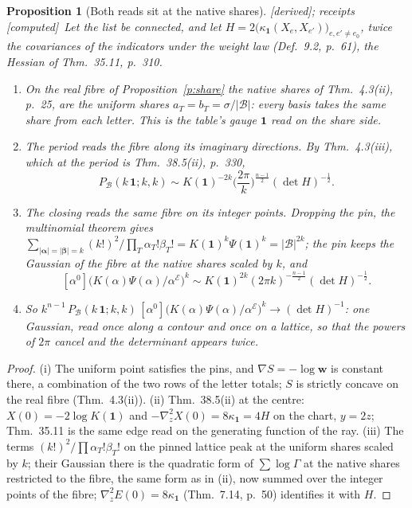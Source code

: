 \documentclass[11pt]{article}
\newcommand{\cE}{\mathcal E}
\newcommand{\cB}{\mathcal B}
\newcommand{\one}{\mathbf 1}
\newcommand{\Pc}[1]{P_{\cB}(#1\,\one;#1,#1)}
\newcommand{\Clo}[1]{[\alpha^0]\big(K(\alpha)\Psi(\alpha)/\alpha^{\cE}\big)^{#1}}
\theoremstyle{plain}
\newtheorem{proposition}{Proposition}[section]
\theoremstyle{definition}
\theoremstyle{remark}
\newcommand{\derived}{\textup{[derived]}}
\newcommand{\computed}{\textup{[computed]}}
\begin{document}
\begin{proposition}[Both reads sit at the native shares]\label{p:edge}\derived; receipts \computed\
Let the list be connected, and let $H=2\big(\kappa_{\one}(X_e,X_{e'})\big)_{e,e'\neq e_0}$, twice the covariances of the indicators under the weight law (Def.~9.2, p.~61), the Hessian of Thm.~35.11, p.~310.
\begin{enumerate}[label=(\roman*)]
\item On the real fibre of Proposition~\ref{p:share} the native shares of Thm.~4.3(ii), p.~25, are the uniform shares $a_T=b_T=\sigma/|\cB|$: every basis takes the same share from each letter. This is the table's gauge $\one$ read on the share side.
\item The period reads the fibre along its imaginary directions. By Thm.~4.3(iii), which at the period is Thm.~38.5(ii), p.~330,
\[
\Pc k\sim K(\one)^{-2k}\Big(\frac{2\pi}k\Big)^{\frac{n-1}2}(\det H)^{-\frac12}.
\]
\item The closing reads the same fibre on its integer points. Dropping the pin, the multinomial theorem gives $\sum_{|\boldsymbol\alpha|=|\boldsymbol\beta|=k}(k!)^2/\prod_T\alpha_T!\beta_T!=K(\one)^k\Psi(\one)^k=|\cB|^{2k}$; the pin keeps the Gaussian of the fibre at the native shares scaled by $k$, and
\[
\Clo k\sim K(\one)^{2k}(2\pi k)^{-\frac{n-1}2}(\det H)^{-\frac12}.
\]
\item So $k^{n-1}\,\Pc k\,\Clo k\to(\det H)^{-1}$: one Gaussian, read once along a contour and once on a lattice, so that the powers of $2\pi$ cancel and the determinant appears twice.
\end{enumerate}
\end{proposition}

\begin{proof}
(i) The uniform point satisfies the pins, and $\nabla S=-\log\mathbf w$ is constant there, a combination of the two rows of the letter totals; $S$ is strictly concave on the real fibre (Thm.~4.3(ii)). (ii) Thm.~38.5(ii) at the centre: $X(0)=-2\log K(\one)$ and $-\nabla_z^2X(0)=8\kappa_{\one}=4H$ on the chart, $y=2z$; Thm.~35.11 is the same edge read on the generating function of the ray. (iii) The terms $(k!)^2/\prod\alpha_T!\beta_T!$ on the pinned lattice peak at the uniform shares scaled by $k$; their Gaussian there is the quadratic form of $\sum\log\Gamma$ at the native shares restricted to the fibre, the same form as in (ii), now summed over the integer points of the fibre; $\nabla^2_zE(0)=8\kappa_{\one}$ (Thm.~7.14, p.~50) identifies it with $H$.
\end{proof}
\end{document}
